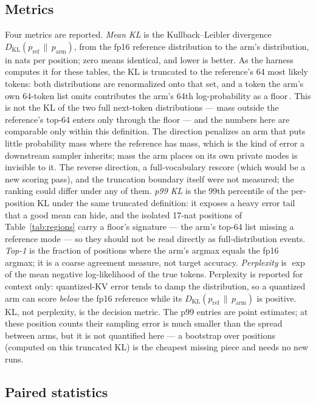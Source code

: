 \documentclass[10pt,twocolumn]{article}
\begin{document}
\subsection{Metrics}

Four metrics are reported. \emph{Mean KL} is the Kullback--Leibler divergence $D_{\mathrm{KL}}(p_{\mathrm{ref}}\,\|\,p_{\mathrm{arm}})$, from the fp16 reference distribution to the arm's distribution, in nats per position; zero means identical, and lower is better. As the harness computes it for these tables, the KL is truncated to the reference's 64 most likely tokens: both distributions are renormalized onto that set, and a token the arm's own 64-token list omits contributes the arm's 64th log-probability as a floor\,\cite{strata-quants}. This is not the KL of the two full next-token distributions --- mass outside the reference's top-64 enters only through the floor --- and the numbers here are comparable only within this definition. The direction penalizes an arm that puts little probability mass where the reference has mass, which is the kind of error a downstream sampler inherits; mass the arm places on its own private modes is invisible to it. The reverse direction, a full-vocabulary rescore (which would be a new scoring pass), and the truncation boundary itself were not measured; the ranking could differ under any of them. \emph{p99 KL} is the 99th percentile of the per-position KL under the same truncated definition: it exposes a heavy error tail that a good mean can hide, and the isolated 17-nat positions of Table~\ref{tab:regions} carry a floor's signature --- the arm's top-64 list missing a reference mode --- so they should not be read directly as full-distribution events. \emph{Top-1} is the fraction of positions where the arm's argmax equals the fp16 argmax; it is a coarse agreement measure, not target accuracy. \emph{Perplexity} is $\exp$ of the mean negative log-likelihood of the true tokens. Perplexity is reported for context only: quantized-KV error tends to damp the distribution, so a quantized arm can score \emph{below} the fp16 reference while its $D_{\mathrm{KL}}(p_{\mathrm{ref}}\,\|\,p_{\mathrm{arm}})$ is positive. KL, not perplexity, is the decision metric. The p99 entries are point estimates; at these position counts their sampling error is much smaller than the spread between arms, but it is not quantified here --- a bootstrap over positions (computed on this truncated KL) is the cheapest missing piece and needs no new runs.

\subsection{Paired statistics}
\end{document}
